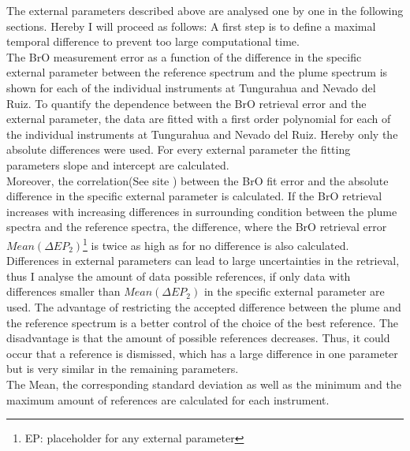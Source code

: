 The external parameters described above are analysed one by one in the following sections. Hereby I will proceed as follows:
A first step is to define a maximal temporal difference to prevent too large computational time.\\
The BrO measurement error as a function of the difference in the specific external parameter between the reference spectrum and the plume spectrum is shown for each of the individual instruments at Tungurahua and Nevado del Ruiz. 
To quantify the dependence between the BrO retrieval error and the external parameter, the data are fitted with a first order polynomial for each of the individual instruments at Tungurahua and Nevado del Ruiz. Hereby only the absolute differences were used. For every external parameter the fitting parameters slope and intercept are calculated.\\
Moreover, the correlation(See site \pageref{ff})  between the BrO fit error and the absolute difference in the specific external parameter is calculated. If the BrO retrieval increases with increasing differences in surrounding condition between the plume spectra and the reference spectra, the difference, where the BrO retrieval error $Mean(\Delta EP_{2})$\footnote{EP: placeholder for any external parameter} is twice as high as for no difference is also calculated.\\  
Differences in external parameters can lead to large uncertainties in the retrieval, thus I analyse the amount of data possible references, if only data with differences smaller than $Mean(\Delta EP_{2})$ in the specific external parameter are used. 
The advantage of restricting the accepted difference between the plume and the reference spectrum is a better control of the choice of the best reference. The disadvantage is that the amount of possible references decreases. Thus, it could occur that a reference is dismissed, which has a large difference in one parameter but is very similar in the remaining parameters.\\
The Mean, the corresponding standard deviation as well as the minimum and the maximum amount of references are calculated for each instrument.
\begin{center}
	\label{ff}
	
\end{center}
%	
